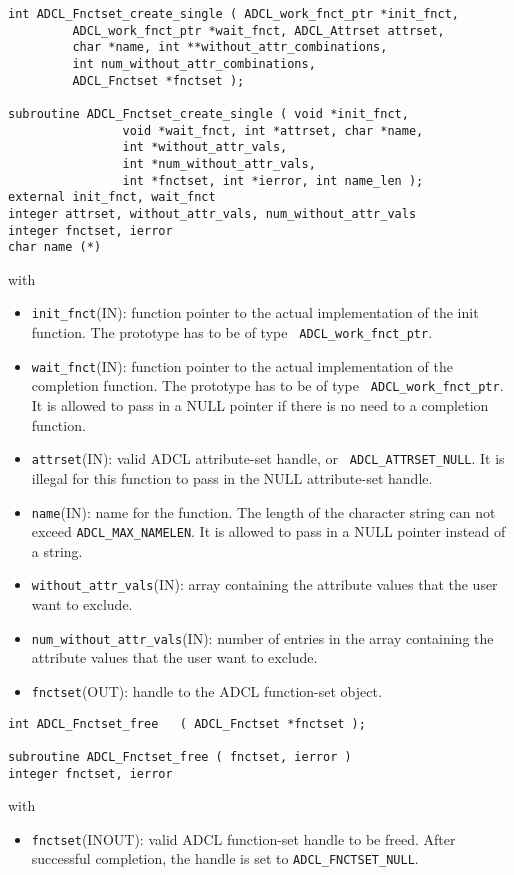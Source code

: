 \begin{verbatim}
int ADCL_Fnctset_create_single ( ADCL_work_fnct_ptr *init_fnct,
         ADCL_work_fnct_ptr *wait_fnct, ADCL_Attrset attrset, 
         char *name, int **without_attr_combinations, 
         int num_without_attr_combinations, 
         ADCL_Fnctset *fnctset );

subroutine ADCL_Fnctset_create_single ( void *init_fnct, 
                void *wait_fnct, int *attrset, char *name,
                int *without_attr_vals, 
                int *num_without_attr_vals,
                int *fnctset, int *ierror, int name_len );
external init_fnct, wait_fnct
integer attrset, without_attr_vals, num_without_attr_vals
integer fnctset, ierror
char name (*)
\end{verbatim}
with
\begin{itemize}

\item {\tt init\_fnct}(IN): function pointer to the actual implementation of
  the init function. The prototype has to be of type {\tt
    ADCL\_work\_fnct\_ptr}.

\item {\tt wait\_fnct}(IN): function pointer to the actual implementation of
  the completion function. The prototype has to be of type {\tt
    ADCL\_work\_fnct\_ptr}.  It is allowed to pass in a NULL pointer if there
  is no need to a completion function.

\item {\tt attrset}(IN): valid ADCL attribute-set handle, or {\tt
  ADCL\_ATTRSET\_NULL}. It is illegal for this function to pass in the NULL
  attribute-set handle.

\item {\tt name}(IN): name for the function. The length of the character
  string can not exceed {\tt ADCL\_MAX\_NAMELEN}. It is allowed to pass in a
  NULL pointer instead of a string.

\item {\tt without\_attr\_vals}(IN): array containing the attribute values
  that the user want to exclude.

\item {\tt num\_without\_attr\_vals}(IN): number of entries in the array
  containing the attribute values that the user want to exclude.

\item {\tt fnctset}(OUT): handle to the ADCL function-set object.
\end{itemize}
\hspace{1cm}
\begin{verbatim}
int ADCL_Fnctset_free   ( ADCL_Fnctset *fnctset );

subroutine ADCL_Fnctset_free ( fnctset, ierror )
integer fnctset, ierror
\end{verbatim}
with
\begin{itemize}

\item {\tt fnctset}(INOUT): valid ADCL function-set handle to be freed. After
  successful completion, the handle is set to {\tt ADCL\_FNCTSET\_NULL}.
\end{itemize}


